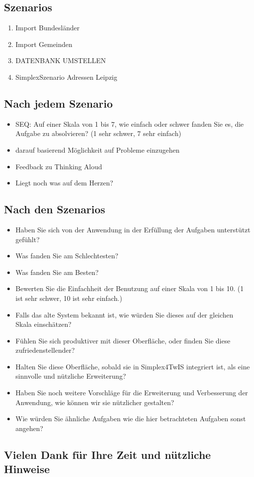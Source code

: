 \subsection*{Szenarios}
\begin{enumerate}
  \item Import Bundesländer
  \item Import Gemeinden
  \item[] DATENBANK UMSTELLEN
  \item SimplexSzenario Adressen Leipzig
\end{enumerate}

\subsection*{Nach jedem Szenario}
\begin{itemize}
  \item SEQ: Auf einer Skala von 1 bis 7, wie einfach oder schwer fanden Sie es, die Aufgabe zu absolvieren? (1 sehr schwer, 7 sehr einfach)
  \item darauf basierend Möglichkeit auf Probleme einzugehen
  \item Feedback zu Thinking Aloud
  \item Liegt noch was auf dem Herzen?
\end{itemize}

\subsection*{Nach den Szenarios}
\begin{itemize}
  \item Haben Sie sich von der Anwendung in der Erfüllung der Aufgaben unterstützt gefühlt?
  \item Was fanden Sie am Schlechtesten?
  \item Was fanden Sie am Besten?
  \item Bewerten Sie die Einfachheit der Benutzung auf einer Skala von 1 bis 10. (1 ist sehr schwer, 10 ist sehr einfach.)
  \item Falls das alte System bekannt ist, wie würden Sie dieses auf der gleichen Skala einschätzen?
  \item Fühlen Sie sich produktiver mit dieser Oberfläche, oder finden Sie diese zufriedenstellender?
  \item Halten Sie diese Oberfläche, sobald sie in Simplex4TwIS integriert ist, als eine sinnvolle und nützliche Erweiterung?
  \item Haben Sie noch weitere Vorschläge für die Erweiterung und Verbesserung der Anwendung, wie können wir sie nützlicher gestalten?
  \item Wie würden Sie ähnliche Aufgaben wie die hier betrachteten Aufgaben sonst angehen?
\end{itemize}

\subsection*{Vielen Dank für Ihre Zeit und nützliche Hinweise}

